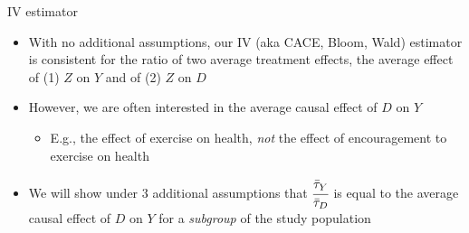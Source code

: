 \documentclass[table, xcolor={dvipsnames}, 9pt]{beamer}
\theoremstyle{newstyle}
\begin{document}
\begin{frame}{IV estimator}
\begin{itemize}
\item With no additional assumptions, our IV (aka CACE, Bloom, Wald) estimator is consistent for the ratio of two average treatment effects, the average effect of (1) $Z$ on $Y$ and of (2) $Z$ on $D$
\item \pause However, we are often interested in the average causal effect of $D$ on $Y$
\begin{itemize}
\item \pause E.g., the effect of exercise on health, \textit{not} the effect of encouragement to exercise on health
\end{itemize}
\item \pause We will show under $3$ additional assumptions that $\cfrac{\bar{\tau}_Y}{\bar{\tau}_D}$ is equal to the average causal effect of $D$ on $Y$ for a \textit{subgroup} of the study population
\end{itemize}	
\end{frame}
\end{document}

